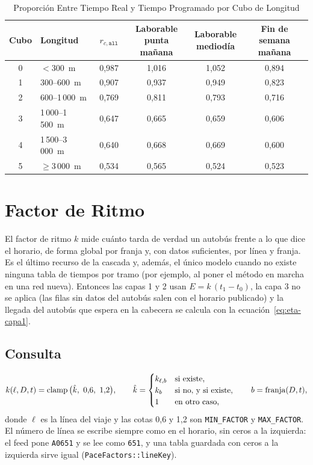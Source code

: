 \begin{table}[ht]
\centering
\caption{Proporción Entre Tiempo Real y Tiempo Programado por Cubo de Longitud}\label{tab:proporciones}
\begin{tabular}{@{}clcccc@{}}
\toprule
Cubo & Longitud & $r_{c,\texttt{all}}$ & \shortstack{Laborable\\punta mañana} & \shortstack{Laborable\\mediodía} & \shortstack{Fin de semana\\mañana}\\
\midrule
0 & $<300$~m        & 0,987 & 1,016 & 1,052 & 0,894\\
1 & 300--600~m      & 0,907 & 0,937 & 0,949 & 0,823\\
2 & 600--1\,000~m   & 0,769 & 0,811 & 0,793 & 0,716\\
3 & 1\,000--1\,500~m & 0,647 & 0,665 & 0,659 & 0,606\\
4 & 1\,500--3\,000~m & 0,640 & 0,668 & 0,669 & 0,600\\
5 & $\ge3\,000$~m    & 0,534 & 0,565 & 0,524 & 0,523\\
\bottomrule
\end{tabular}
\end{table}

\section{Factor de Ritmo}
\label{sec:k}

El factor de ritmo $k$ mide cuánto tarda de verdad un autobús frente a lo que dice el horario, de forma global por
franja y, con datos suficientes, por línea y franja. Es el último recurso de la cascada y, además, el único modelo
cuando no existe ninguna tabla de tiempos por tramo (por ejemplo, al poner el método en marcha en una red nueva).
Entonces las capas 1 y 2 usan $E=k\,(t_1-t_0)$, la capa 3 no se aplica (las filas sin datos del autobús salen con el
horario publicado) y la llegada del autobús que espera en la cabecera se calcula con la ecuación~\eqref{eq:eta-capa1}.

\subsection{Consulta}

\begin{equation}
\label{eq:k}
k(\ell,D,t)=\operatorname{clamp}\big(\hat k,\ 0{,}6,\ 1{,}2\big),\qquad
\hat k=\begin{cases}
k_{\ell,b} & \text{si existe},\\
k_b & \text{si no, y si existe},\\
1 & \text{en otro caso,}
\end{cases}\qquad b=\operatorname{franja}(D,t),
\end{equation}
donde $\ell$ es la línea del viaje y las cotas 0,6 y 1,2 son \texttt{MIN\_FACTOR} y \texttt{MAX\_FACTOR}. El número de
línea se escribe siempre como en el horario, sin ceros a la izquierda: el feed pone \texttt{A0651} y se lee como
\texttt{651}, y una tabla guardada con ceros a la izquierda sirve igual (\texttt{PaceFactors::lineKey}).

